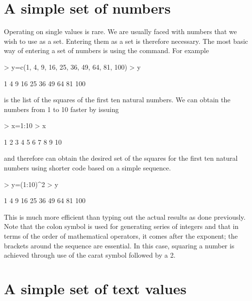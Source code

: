 \section{A simple set of numbers}

Operating on single values is rare. We are usually faced with numbers that we wish to use as a set. Entering them as a set is therefore necessary. The most basic way of entering a set of numbers is using the  command. For example
\begin{Schunk}
\begin{Sinput}
> y=c(1, 4, 9, 16, 25, 36, 49, 64, 81, 100)
> y
\end{Sinput}
\begin{Soutput}
 [1]   1   4   9  16  25  36  49  64  81 100
\end{Soutput}
\end{Schunk}
is the list of the squares of the first ten natural numbers. We can obtain the numbers from 1 to 10 faster by issuing
\begin{Schunk}
\begin{Sinput}
> x=1:10
> x
\end{Sinput}
\begin{Soutput}
 [1]  1  2  3  4  5  6  7  8  9 10
\end{Soutput}
\end{Schunk}
and therefore can obtain the desired set of the squares for the first ten natural numbers using shorter code based on a simple sequence.
\begin{Schunk}
\begin{Sinput}
> y=(1:10)^2
> y
\end{Sinput}
\begin{Soutput}
 [1]   1   4   9  16  25  36  49  64  81 100
\end{Soutput}
\end{Schunk}
This is much more efficient than typing out the actual results as done previously. Note that the colon symbol is used for generating series of integers and that in terms of the order of mathematical operators, it comes after the exponent; the brackets around the sequence are essential. In this case, squaring a number is achieved through use of the carat symbol followed by a 2. 


\section{A simple set of text values}

